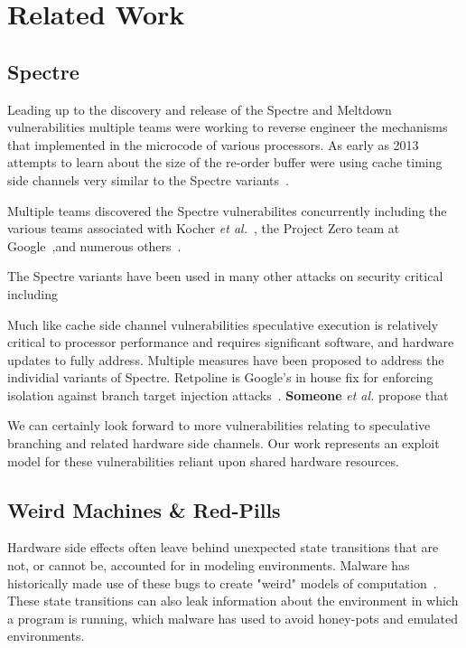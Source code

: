 
\section{Related Work}
\label{sec:related-work}



\subsection{Spectre}

Leading up to the discovery and release of the Spectre and Meltdown vulnerabilities
multiple teams were working to reverse engineer the mechanisms that implemented in 
the microcode of various processors. As early as 2013 attempts to learn about the size 
of the re-order buffer were using cache timing side channels very similar to the 
Spectre variants~\cite{measuring-rob}. 

Multiple teams discovered the Spectre vulnerabilites concurrently including the 
various teams associated with Kocher \textit{et al.}~\cite{spectre}, the Project Zero team 
at Google~\cite{project_zero},and numerous others~\cite{}. 


The Spectre variants have been used in many other attacks on security critical 
including 

Much like cache side channel vulnerabilities speculative execution is relatively
critical to processor performance and requires significant software, and hardware 
updates to fully address. Multiple measures have been proposed to address the 
individial variants of Spectre. Retpoline is Google's in house fix for enforcing 
isolation against branch target injection attacks~\cite{retpoline}. \textbf{Someone} 
\textit{et al.} propose that 

We can certainly look forward to more vulnerabilities relating to speculative 
branching and related hardware side channels. Our work represents an exploit 
model for these vulnerabilities reliant upon shared hardware resources. 


\subsection{Weird Machines \& Red-Pills}
Hardware side effects often leave behind unexpected state transitions 
that are not, or cannot be, accounted for in modeling environments. Malware
has historically made use of these bugs to create "weird" models of 
computation~\cite{weird_machines}. These state transitions can also leak 
information about the environment in which a program is running, which 
malware has used to avoid honey-pots and emulated environments.


